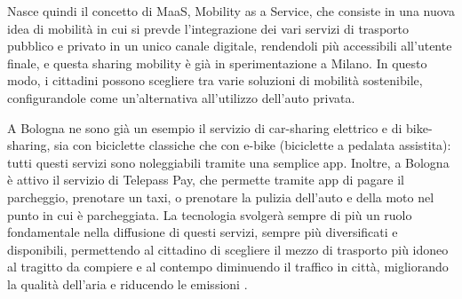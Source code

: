 Nasce quindi il concetto di MaaS, Mobility as a Service, che consiste in una nuova idea di mobilità in cui si prevde l'integrazione dei vari servizi di trasporto pubblico e privato in un unico canale digitale, rendendoli più accessibili all'utente finale, e questa sharing mobility è già in sperimentazione a Milano. In questo modo, i cittadini possono scegliere tra varie soluzioni di mobilità sostenibile, configurandole come un'alternativa all'utilizzo dell'auto privata.

A Bologna ne sono già un esempio il servizio di car-sharing elettrico e di bike-sharing, sia con biciclette classiche che con e-bike (biciclette a pedalata assistita): tutti questi servizi sono noleggiabili tramite una semplice app. Inoltre, a Bologna è attivo il servizio di Telepass Pay, che permette tramite app di pagare il parcheggio, prenotare un taxi, o prenotare la pulizia dell'auto e della moto nel punto in cui è parcheggiata. La tecnologia svolgerà sempre di più un ruolo fondamentale nella diffusione di questi servizi, sempre più diversificati e disponibili, permettendo al cittadino di scegliere il mezzo di trasporto più idoneo al tragitto da compiere e al contempo diminuendo il traffico in città, migliorando la qualità dell'aria e riducendo le emissioni \cite{Bolognatoday_Smart_City}.




